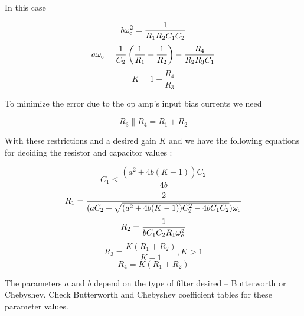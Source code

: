 In this case

\begin{equation}
b\omega_\mathrm{c}^2 = \frac{1}{R_1 R_2 C_1 C_2}
\end{equation}
\begin{equation}
a\omega_\mathrm{c} = \frac{1}{C_2}\left(\frac{1}{R_1} + \frac{1}{R_2}\right) - \frac{R_4}{R_2 R_3 C_1}
\end{equation}
\begin{equation}
K = 1 + \frac{R_4}{R_3}
\end{equation}

To minimize the error due to the op amp's input bias currents we need

\begin{equation}
R_3 \parallel R_4 = R_1 + R_2
\end{equation}

With these restrictions and a desired gain $K$ and \wcutoff we have the following equations for deciding the resistor and capacitor values \autocite[118-119]{op-amp-circuits-johnson}:

\begin{equation}
C_1 \leq \frac{(a^2 + 4b(K-1))C_2}{4b}
\end{equation}
\begin{equation}
R_1 = \frac{2}{(a C_2+\sqrt{(a^2 + 4b(K-1))C_2^2 - 4b C_1 C_2})\omega_\mathrm{c}}
\end{equation}
\begin{equation}
R_2 = \frac{1}{bC_1 C_2 R_1\omega_\mathrm{c}^2}
\end{equation}
\begin{equation}
R_3 = \frac{K(R_1 + R_2)}{K-1}, K > 1
\end{equation}
\begin{equation}
R_4 = K(R_1 + R_2)
\end{equation}

The parameters $a$ and $b$ depend on the type of filter desired -- Butterworth or Chebyshev.
Check Butterworth and Chebyshev coefficient tables for these parameter values.


